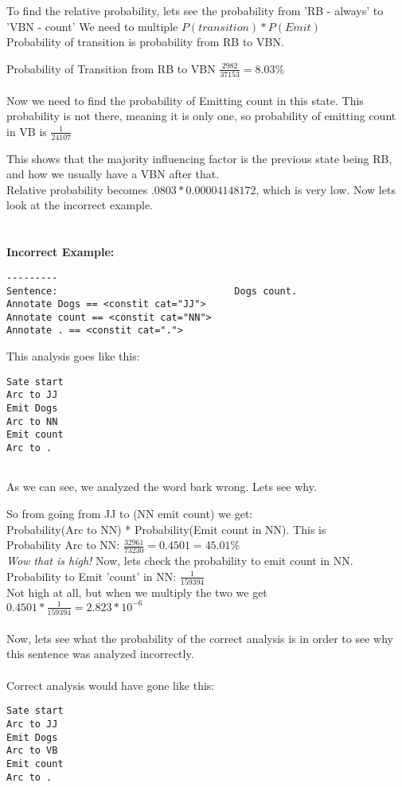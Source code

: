 \documentclass{article}
\begin{document}
\begin{itemize}
\begin{verbatim}
\end{verbatim}
To find the relative probability, lets see the probability from 'RB - always' to 'VBN - count'
We need to multiple $P(transition) * P(Emit)$\\
Probability of transition is probability from RB to VBN.

Probability of Transition from RB to VBN $\frac{2982}{37153} = 8.03\%$
\\
\\
Now we need to find the probability of Emitting count in this state.
This probability is not there, meaning it is only one, so probability of emitting count in VB is $\frac{1}{24107}$

This shows that the majority influencing factor is the previous state being RB, and how we usually have a VBN after that.
\\ 
Relative probability becomes $.0803 * 0.00004148172$, which is very low.  Now lets look at the incorrect example.
\\ \\ \\
\textbf{Incorrect Example: }
\begin{verbatim}
---------
Sentence:                               Dogs count.
Annotate Dogs == <constit cat="JJ">
Annotate count == <constit cat="NN">
Annotate . == <constit cat=".">
\end{verbatim}
This analysis goes like this: 
\begin{verbatim}
Sate start 
Arc to JJ
Emit Dogs
Arc to NN
Emit count
Arc to .


\end{verbatim}
 As we can see, we analyzed the word bark wrong.  Lets see why.
 
 So from going from JJ to (NN emit count) we get:
 \\
 Probability(Arc to NN) * Probability(Emit count in NN).  This is \\
 
 Probability Arc to NN: $\frac{32961}{73230} = 0.4501 = 45.01\%$\\
\textit{Wow that is high!} Now, lets check the probability to emit count in NN.
\\
Probability to Emit 'count' in NN: $\frac{1}{159394}$
\\
Not high at all, but when we multiply the two we get
\\ $0.4501 * \frac{1}{159394} = 2.823 * 10^{-6}$
\\ \\
Now, lets see what the probability of the correct analysis is in order to see why this sentence was analyzed incorrectly.
\\ \\
Correct analysis would have gone like this: 
\begin{verbatim}
Sate start 
Arc to JJ
Emit Dogs
Arc to VB
Emit count
Arc to .



\end{verbatim}
\end{itemize}
\end{document}
